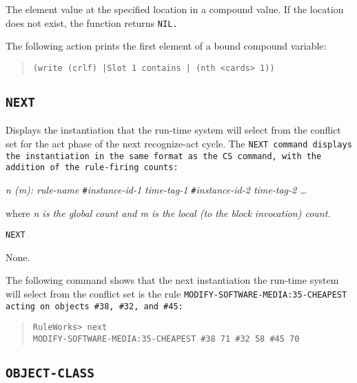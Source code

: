 \ReturnValue

The element value at the specified location in a compound
value. If the location does not exist, the function returns
\tt{NIL}.

\Example

The following action prints the first element of a bound compound
variable:

\begin{quote}
\begin{verbatim}
(write (crlf) |Slot 1 contains | (nth <cards> 1))
\end{verbatim}
\end{quote}

\subsection{\tt{NEXT}}

Displays the instantiation that the run-time system will select from
the conflict set for the act phase of the next recognize-act
cycle. The \tt{NEXT} command displays the instantiation in the same
format as the \tt{CS} command, with the addition of the rule-firing
counts:

\it{n} (\it{m}): \it{rule-name} \verb|#|\it{instance-id-1}
\it{time-tag-1} \verb|#|\it{instance-id-2} \it{time-tag-2} \ldots

where \it{n} is the global count and \it{m} is the local (to the block
invocation) count.

\Format

\tt{NEXT}

\Arguments

None.

\Example

The following command shows that the next instantiation the run-time
system will select from the conflict set is the rule
\tt{MODIFY-SOFTWARE-MEDIA:35-CHEAPEST} acting on objects \verb|#38|,
\verb|#32|, and \verb|#45|:

\begin{quote}
\begin{verbatim}
RuleWorks> next
MODIFY-SOFTWARE-MEDIA:35-CHEAPEST #38 71 #32 58 #45 70
\end{verbatim}
\end{quote}

\subsection{\tt{OBJECT-CLASS}}

